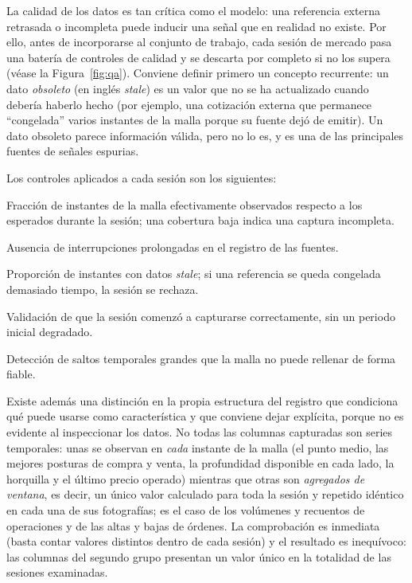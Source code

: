 La calidad de los datos es tan crítica como el modelo: una referencia externa retrasada o
incompleta puede inducir una señal que en realidad no existe. Por ello, antes de incorporarse
al conjunto de trabajo, cada sesión de mercado pasa una batería de controles de calidad y se
descarta por completo si no los supera (véase la Figura~\ref{fig:qa}). Conviene definir primero un
concepto recurrente: un dato \emph{obsoleto} (en inglés \emph{stale}) es un valor que no se ha
actualizado cuando debería haberlo hecho (por ejemplo, una cotización externa que permanece
``congelada'' varios instantes de la malla porque su fuente dejó de emitir). Un dato obsoleto
parece información válida, pero no lo es, y es una de las principales fuentes de señales
espurias.

Los controles aplicados a cada sesión son los siguientes:
\begin{description}[noitemsep, leftmargin=2.6cm, font=\bfseries]
\item[Cobertura] Fracción de instantes de la malla efectivamente observados respecto a los
esperados durante la sesión; una cobertura baja indica una captura incompleta.
\item[Continuidad] Ausencia de interrupciones prolongadas en el registro de las fuentes.
\item[Obsolescencia] Proporción de instantes con datos \emph{stale}; si una referencia se
queda congelada demasiado tiempo, la sesión se rechaza.
\item[Arranque] Validación de que la sesión comenzó a capturarse correctamente, sin un
periodo inicial degradado.
\item[Huecos severos] Detección de saltos temporales grandes que la malla no puede rellenar
de forma fiable.
\end{description}

Existe además una distinción en la propia estructura del registro que condiciona qué puede
usarse como característica y que conviene dejar explícita, porque no es evidente al
inspeccionar los datos. No todas las columnas capturadas son series temporales: unas se
observan en \emph{cada} instante de la malla (el punto medio, las mejores posturas de compra
y venta, la profundidad disponible en cada lado, la horquilla y el último precio operado)
mientras que otras son \emph{agregados de ventana}, es decir, un único valor calculado para
toda la sesión y repetido idéntico en cada una de sus fotografías; es el caso de los
volúmenes y recuentos de operaciones y de las altas y bajas de órdenes. La comprobación es
inmediata (basta contar valores distintos dentro de cada sesión) y el resultado es
inequívoco: las columnas del segundo grupo presentan un valor único en la totalidad de las
sesiones examinadas.

